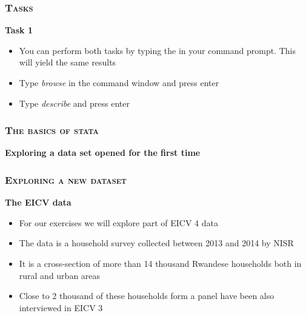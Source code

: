 \documentclass[10pt]{beamer}
\begin{document}
	\begin{frame}
		\frametitle{\textsc{Tasks}}
		\begin{center}
			\Large\textbf{Task 1}
		\end{center}
		\begin{itemize}
			\item You can perform both tasks by typing the in your command prompt. This will yield the same results
			
			\item Type \textit{browse} in the command window and press enter
			
			\item Type \textit{describe} and press enter
			
		\end{itemize}
	\end{frame}





	\begin{frame}
		\frametitle{\textsc{The basics of stata}}
		\begin{center}
			\Large\textbf{Exploring a data set opened for the first time}
		\end{center}
	\end{frame}


	\begin{frame}
		\frametitle{\textsc{Exploring a new dataset}}
		\begin{center}
			\Large\textbf{The EICV data}
		\end{center}
		\begin{itemize}
			\item For our exercises we will explore part of EICV 4 data
			\item The data is a household survey collected between 2013 and 2014 by NISR
			\item It is a cross-section of more than 14 thousand Rwandese households both in rural and urban areas
			\item Close to 2 thousand of these households form a panel have been also interviewed in EICV 3		
		\end{itemize}
	\end{frame}
\end{document}
